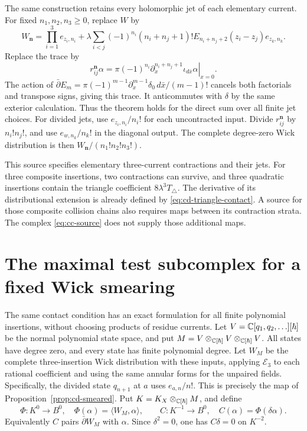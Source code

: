 The same construction retains every holomorphic jet of each elementary
current.  For fixed $n_1,n_2,n_3\ge0$, replace $W$ by
\[
 W_{\mathbf n}=
 \prod_{i=1}^3e_{z_i,n_i}
 +\lambda\sum_{i<j}(-1)^{n_i}(n_i+n_j+1)!
        E_{n_i+n_j+2}(z_i-z_j)e_{z_k,n_k}.
\]
Replace the trace by
\[
 r_{ij}^{\mathbf n}\alpha
  =\left.\pi(-1)^{n_i}\partial_x^{n_i+n_j+1}
                     \iota_{d\bar x}\alpha\right|_{x=0}.
\]
The action of
$\bar\partial E_m=\pi(-1)^{m-1}\partial_x^{m-1}\delta_0\,d\bar x/(m-1)!$
cancels both factorials and transpose signs, giving this trace.
It anticommutes with $\delta$ by the same exterior calculation.
Thus the theorem holds for the direct sum over all finite jet choices.
For divided jets, use $e_{z_i,n_i}/n_i!$ for each uncontracted input.
Divide $r_{ij}^{\mathbf n}$ by $n_i!n_j!$, and use
$e_{w,n_k}/n_k!$ in the diagonal output.
The complete degree-zero Wick distribution is then
$W_{\mathbf n}/(n_1!n_2!n_3!)$.

This source specifies elementary three-current contractions and their
jets.  For three composite insertions, two contractions can survive, and
three quadratic insertions contain the triangle coefficient
$8\lambda^3T_\triangle$.
The derivative of its distributional extension is already defined by
\eqref{eq:cd-triangle-contact}.  A source for those composite collision
chains also requires maps between its contraction strata.  The complex
\eqref{eq:cc-source} does not supply those additional maps.

\section{The maximal test subcomplex for a fixed Wick smearing}

The same contact condition has an exact formulation for all finite
polynomial insertions, without choosing products of residue currents.
Let $V=\mathbb C[q_1,q_2,\ldots][\hbar]$ be the normal polynomial state space,
and put $M=V\otimes_{\mathbb C[\hbar]}V\otimes_{\mathbb C[\hbar]}V$.
All states have degree zero, and every state has finite polynomial degree.
Let $W_M$ be the complete three-insertion Wick distribution with these
inputs, applying $\mathcal E_3$ to each rational coefficient and using
the same annular forms for the unpaired fields.
Specifically, the divided state $q_{n+1}$ at $a$ uses $e_{a,n}/n!$.
This is precisely the map of Proposition~\ref{prop:cd-smeared}.
Put $K=K_X\otimes_{\mathbb C[\hbar]}M$, and define
\[
 \Phi:K^0\to B^0,\quad \Phi(\alpha)=\langle W_M,\alpha\rangle,
 \qquad C:K^{-1}\to B^0,\quad C(\alpha)=\Phi(\delta\alpha).
\]
Equivalently $C$ pairs $\bar\partial W_M$ with $\alpha$.
Since $\delta^2=0$, one has $C\delta=0$ on $K^{-2}$.

